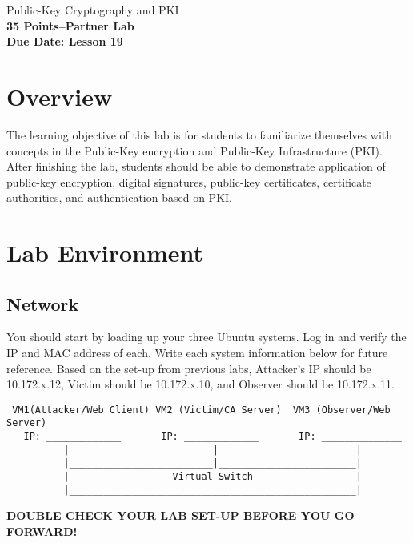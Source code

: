 \documentclass{article}
\begin{document}
\begin{center}
{\LARGE Public-Key Cryptography and PKI}\\
\textbf{35 Points--Partner Lab }\\
\textbf{Due Date: Lesson 19}\\
\end{center}

\copyrightnoticeA

\setcounter{task}{1}
\newcommand{\mytask} {{\arabic{task}}\addtocounter{task}{1}}

\section{Overview}
The learning objective of this lab is for students to familiarize themselves with concepts in the Public-Key encryption and Public-Key Infrastructure (PKI).
After finishing the lab, students should be able to demonstrate application of public-key encryption, digital signatures, public-key certificates,
certificate authorities, and authentication based on PKI. 


\section{Lab Environment}

\subsection{Network}
You should start by loading up your three Ubuntu systems. Log in and verify the IP and MAC address of each. Write each system information below for future reference. Based on the set-up from previous labs, Attacker's IP should be 10.172.x.12, Victim should be 10.172.x.10, and Observer should be 10.172.x.11.

\begin{verbatim}
 VM1(Attacker/Web Client) VM2 (Victim/CA Server)  VM3 (Observer/Web Server)
   IP: _____________       IP: _____________       IP: ______________
          |                         |                        |
          |_________________________|________________________|
          |                  Virtual Switch                  |
          |__________________________________________________|

\end{verbatim}

\textbf{DOUBLE CHECK YOUR LAB SET-UP BEFORE YOU GO FORWARD!}  
\end{document}
